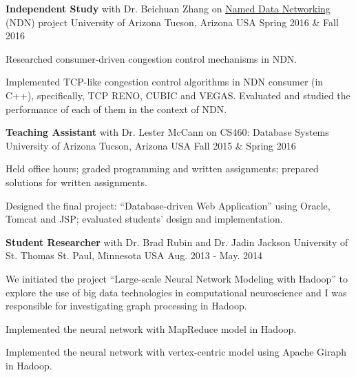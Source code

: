 \begin{cventries}
  \cventry
    {\textbf{Independent Study} with Dr. Beichuan Zhang
    on \href{https://named-data.net/}{Named Data Networking} (NDN) project} %
    {University of Arizona} %
    {Tucson, Arizona USA} %
    {Spring 2016 \& Fall 2016} %
    {
      \begin{cvitems} %
        \item {Researched consumer-driven congestion control mechanisms in
    NDN.}
        \item {Implemented TCP-like congestion control algorithms in NDN
    consumer (in C++), specifically, TCP RENO, CUBIC and VEGAS.
    Evaluated and studied the performance of each of them in the
    context of NDN.}
      \end{cvitems}
    }


  \cventry
    {\textbf{Teaching Assistant} with Dr. Lester McCann
    on CS460: Database Systems}
    {University of Arizona} %
    {Tucson, Arizona USA} %
    {Fall 2015 \& Spring 2016} %
    {
      \begin{cvitems} %
        \item {Held office hours; graded programming and written
    assignments; prepared solutions for written assignments.}
        \item {Designed the final project: ``Database-driven Web
    Application'' using Oracle, Tomcat and JSP; evaluated
    students' design and implementation.}
      \end{cvitems}
    }

  \cventry
    {\textbf{Student Researcher} with Dr. Brad Rubin and Dr. Jadin Jackson}
    {University of St. Thomas} %
    {St. Paul, Minnesota USA} %
    {Aug. 2013 - May. 2014} %
    {
      \begin{cvitems} %
        \item {We initiated the project ``Large-scale Neural Network
    Modeling with Hadoop'' to explore the use of big data technologies in
    computational neuroscience and I was responsible for investigating 
    graph processing in Hadoop.}
        \item {Implemented the neural network with MapReduce model in
    Hadoop.}
        \item {Implemented the neural network with vertex-centric model
    using Apache Giraph in Hadoop.}
      \end{cvitems}
    }

\end{cventries}
